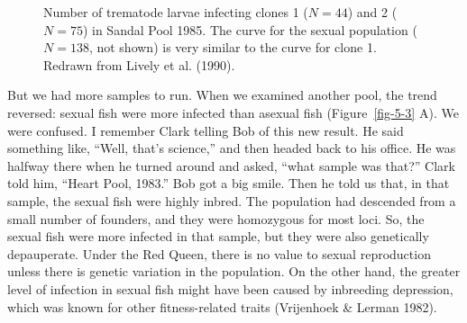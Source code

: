 \documentclass[
  letterpaper,
]{book}
\begin{document}
\begin{figure}


\caption[Number of trematode larvae infecting clones 1 and 2 in Sandal
Pool 1985]{\label{fig-5-2}Number of trematode larvae infecting clones 1
(\(N=44\)) and 2 (\(N=75\)) in Sandal Pool 1985. The curve for the
sexual population (\(N=138\), not shown) is very similar to the curve
for clone 1. Redrawn from Lively et al. (1990).}

\end{figure}%

But we had more samples to run. When we examined another pool, the trend
reversed: sexual fish were more infected than asexual fish
(Figure~\ref{fig-5-3} A). We were confused. I remember Clark telling Bob
of this new result. He said something like, ``Well, that's science,''
and then headed back to his office. He was halfway there when he turned
around and asked, ``what sample was that?'' Clark told him, ``Heart
Pool, 1983.'' Bob got a big smile. Then he told us that, in that sample,
the sexual fish were highly inbred. The population had descended from a
small number of founders, and they were homozygous for most loci. So,
the sexual fish were more infected in that sample, but they were also
genetically depauperate. Under the Red Queen, there is no value to
sexual reproduction unless there is genetic variation in the population.
On the other hand, the greater level of infection in sexual fish might
have been caused by inbreeding depression, which was known for other
fitness-related traits (Vrijenhoek \& Lerman 1982).
\end{document}
